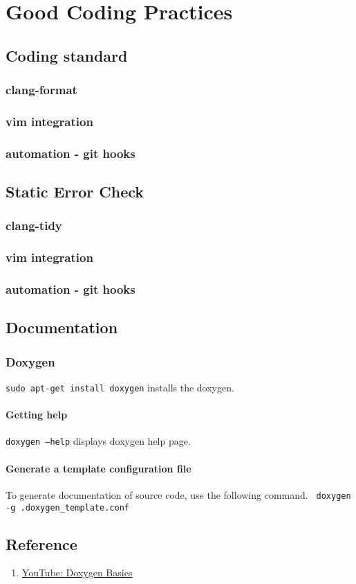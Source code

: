 \chapter{Good Coding Practices}


\section{Coding standard} 
\subsection{clang-format}
\subsection{vim integration}
\subsection{automation - git hooks}


\section{Static Error Check} 
\subsection{clang-tidy}
\subsection{vim integration}
\subsection{automation - git hooks}

\section{Documentation}
\subsection{Doxygen}
\texttt{sudo apt-get install doxygen} installs the doxygen.

\subsubsection{Getting help}
\texttt{doxygen --help} displays doxygen help page.

\subsubsection{Generate a template configuration file}

To generate documentation of source code, use the following command.
\texttt{ doxygen -g .doxygen_template.conf}

\section{Reference}

\begin{enumerate}
  \item \href{https://www.youtube.com/watch?v=TtRn3HsOm1s}{YouTube: Doxygen Basics}
\end{enumerate}
